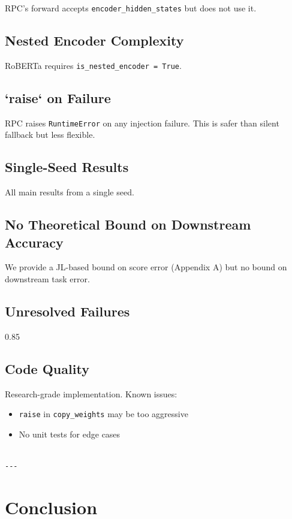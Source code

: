 RPC's forward accepts \texttt{encoder\_hidden\_states} but does not use it.

\subsection{Nested Encoder Complexity}

RoBERTa requires \texttt{is\_nested\_encoder = True}.

\subsection{`raise` on Failure}

RPC raises \texttt{RuntimeError} on any injection failure. This is safer than 
silent fallback but less flexible.

\subsection{Single-Seed Results}

All main results from a single seed.

\subsection{No Theoretical Bound on Downstream Accuracy}

We provide a JL-based bound on score error (Appendix A) but no bound on 
downstream task error.

\subsection{Unresolved Failures}

0.85

\subsection{Code Quality}

Research-grade implementation. Known issues:
\begin{itemize}
\item \texttt{raise} in \texttt{copy\_weights} may be too aggressive
\item No unit tests for edge cases
\end{itemize}
\begin{lstlisting}

---
\end{lstlisting}


\section{Conclusion}


